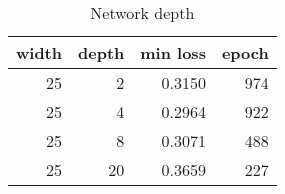 \begin{table}
\centering
\caption{Network depth}
\label{tab:depth}
\begin{tabular}{rrrr}
\toprule
 width &  depth &  min loss &  epoch \\
\midrule
    25 &      2 &    0.3150 &    974 \\
    25 &      4 &    0.2964 &    922 \\
    25 &      8 &    0.3071 &    488 \\
    25 &     20 &    0.3659 &    227 \\
\bottomrule
\end{tabular}
\end{table}
